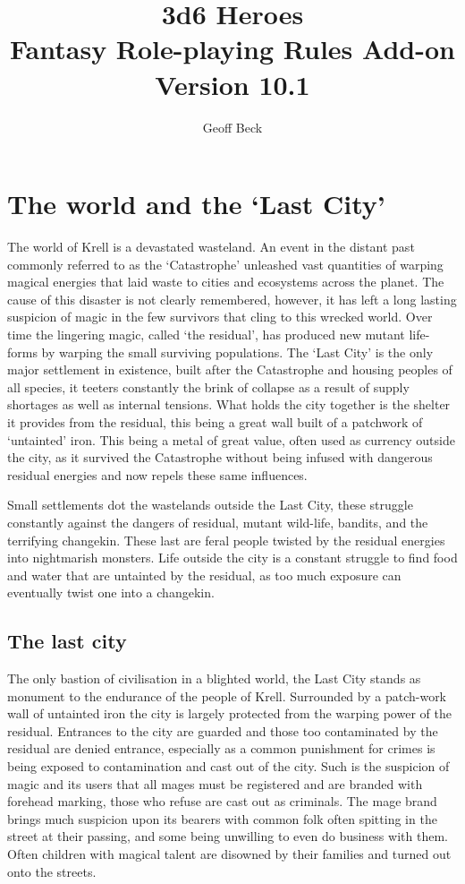 \documentclass[a4paper,11pt,oneside]{book}
\title{\textbf{\huge 3d6 Heroes \\Fantasy Role-playing Rules Add-on \\Version 10.1}}
\author{Geoff Beck}
\date{}
\begin{document}
\maketitle
\frontmatter
\tableofcontents
\mainmatter

\chapter{The world and the `Last City'}
The world of Krell is a devastated wasteland. An event in the distant past commonly referred to as the `Catastrophe' unleashed vast quantities of warping magical energies that laid waste to cities and ecosystems across the planet. The cause of this disaster is not clearly remembered, however, it has left a long lasting suspicion of magic in the few survivors that cling to this wrecked world. Over time the lingering magic, called `the residual', has produced new mutant life-forms by warping the small surviving populations. The `Last City' is the only major settlement in existence, built after the Catastrophe and housing peoples of all species, it teeters constantly the brink of collapse as a result of supply shortages as well as internal tensions. What holds the city together is the shelter it provides from the residual, this being a great wall built of a patchwork of `untainted' iron. This being a metal of great value, often used as currency outside the city, as it survived the Catastrophe without being infused with dangerous residual energies and now repels these same influences.    

Small settlements dot the wastelands outside the Last City, these struggle constantly against the dangers of residual, mutant wild-life, bandits, and the terrifying changekin. These last are feral people twisted by the residual energies into nightmarish monsters. Life outside the city is a constant struggle to find food and water that are untainted by the residual, as too much exposure can eventually twist one into a changekin.

\section{The last city}
The only bastion of civilisation in a blighted world, the Last City stands as monument to the endurance of the people of Krell. Surrounded by a patch-work wall of untainted iron the city is largely protected from the warping power of the residual. Entrances to the city are guarded and those too contaminated by the residual are denied entrance, especially as a common punishment for crimes is being exposed to contamination and cast out of the city. Such is the suspicion of magic and its users that all mages must be registered and are branded with forehead marking, those who refuse are cast out as criminals. The mage brand brings much suspicion upon its bearers with common folk often spitting in the street at their passing, and some being unwilling to even do business with them. Often children with magical talent are disowned by their families and turned out onto the streets. 
\end{document}
